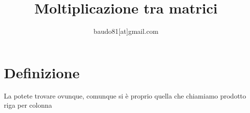 \documentclass[a4paper,10pt]{article}
\title{Moltiplicazione tra matrici}
\author{baudo81[at]gmail.com}
\begin{document}
\maketitle

\begin{abstract}

\end{abstract}

\section{Definizione}
La potete trovare ovunque, comunque si è proprio quella che chiamiamo prodotto riga per colonna
\end{document}
